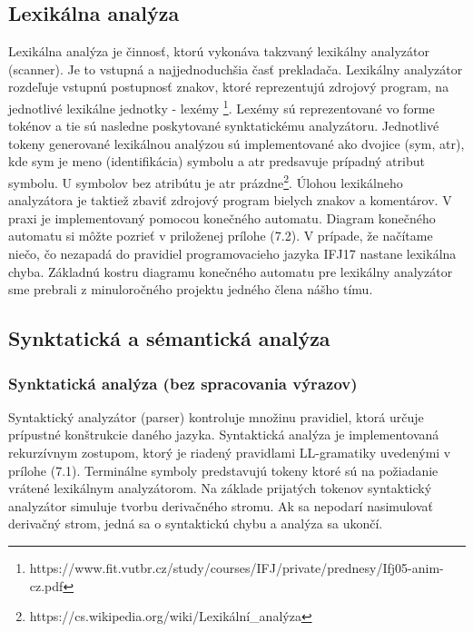 \documentclass[11pt,a4paper]{article}
\begin{document}
	\subsection{Lexikálna analýza}

	Lexikálna analýza je činnosť, ktorú vykonáva takzvaný lexikálny analyzátor (scanner). Je to vstupná a najjednoduchšia časť prekladača. Lexikálny analyzátor rozdeľuje vstupnú postupnosť znakov, ktoré reprezentujú zdrojový program, na jednotlivé lexikálne jednotky - lexémy \footnote{https://www.fit.vutbr.cz/study/courses/IFJ/private/prednesy/Ifj05-anim-cz.pdf}. Lexémy sú reprezentované vo forme tokénov a tie sú nasledne poskytované synktatickému analyzátoru. Jednotlivé tokeny generované lexikálnou analýzou sú implementované ako dvojice (sym, atr), kde sym je meno (identifikácia) symbolu a atr predsavuje prípadný atribut symbolu. U symbolov bez atribútu je atr prázdne\footnote{https://cs.wikipedia.org/wiki/Lexikální\_analýza}. Úlohou lexikálneho analyzátora je taktiež zbaviť zdrojový program bielych znakov a komentárov. V praxi je implementovaný pomocou konečného automatu. Diagram konečného automatu si môžte pozrieť v priloženej prílohe (7.2). V prípade, že načítame niečo, čo nezapadá do pravidiel programovacieho jazyka IFJ17 nastane lexikálna chyba. Základnú kostru diagramu konečného automatu pre lexikálny analyzátor sme prebrali z minuloročného projektu jedného člena nášho tímu.

	\subsection{Synktatická a sémantická analýza}
		\subsubsection{Synktatická analýza (bez spracovania výrazov)}

		Syntaktický analyzátor (parser) kontroluje množinu pravidiel, ktorá určuje prípustné konštrukcie daného jazyka. Syntaktická analýza je 
		implementovaná rekurzívnym zostupom, ktorý je riadený pravidlami LL-gramatiky uvedenými v prílohe (7.1). Terminálne symboly predstavujú 
		tokeny ktoré sú na požiadanie vrátené lexikálnym analyzátorom. Na základe prijatých tokenov syntaktický analyzátor simuluje tvorbu 
		derivačného stromu. Ak sa nepodarí nasimulovať derivačný strom, jedná sa o syntaktickú chybu a analýza sa ukončí.
\end{document}
